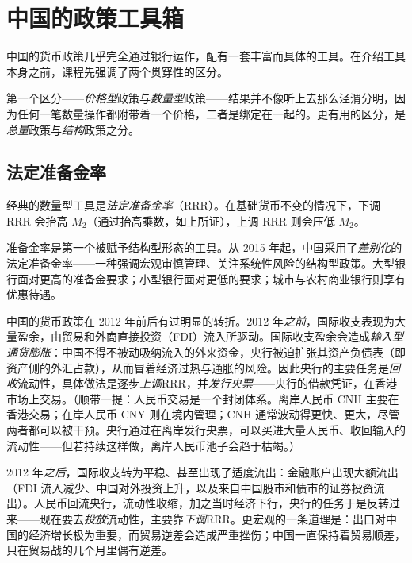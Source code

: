 
\section{中国的政策工具箱}

中国的货币政策几乎完全通过银行运作，配有一套丰富而具体的工具。在介绍工具本身之前，课程先强调了两个贯穿性的区分。

第一个区分——\emph{价格型}政策与\emph{数量型}政策——结果并不像听上去那么泾渭分明，因为任何一笔数量操作都附带着一个价格，二者是绑定在一起的。更有用的区分，是\emph{总量}政策与\emph{结构}政策之分。


\subsection{法定准备金率}

经典的数量型工具是\emph{法定准备金率}（RRR）。在基础货币不变的情况下，下调 RRR 会抬高 $M_2$（通过抬高乘数，如上所证），上调 RRR 则会压低 $M_2$。

\begin{remark}[2015 年以来的差别化准备金率]
准备金率是第一个被赋予结构型形态的工具。从 2015 年起，中国采用了\emph{差别化}的法定准备金率——一种强调宏观审慎管理、关注系统性风险的结构型政策。大型银行面对更高的准备金要求；小型银行面对更低的要求；城市与农村商业银行则享有优惠待遇。
\end{remark}

\begin{remark}
中国的货币政策在 2012 年前后有过明显的转折。2012 年\emph{之前}，国际收支表现为大量盈余，由贸易和外商直接投资（FDI）流入所驱动。国际收支盈余会造成\emph{输入型通货膨胀}：中国不得不被动吸纳流入的外来资金，央行被迫扩张其资产负债表（即资产侧的外汇占款），从而冒着经济过热与通胀的风险。因此央行的主要任务是\emph{回收}流动性，具体做法是逐步\emph{上调}RRR，并\emph{发行央票}——央行的借款凭证，在香港市场上交易。（顺带一提：人民币交易是一个封闭体系。离岸人民币 CNH 主要在香港交易；在岸人民币 CNY 则在境内管理；CNH 通常波动得更快、更大，尽管两者都可以被干预。央行通过在离岸发行央票，可以买进大量人民币、收回输入的流动性——但若持续这样做，离岸人民币池子会趋于枯竭。）

2012 年\emph{之后}，国际收支转为平稳、甚至出现了适度流出：金融账户出现大额流出（FDI 流入减少、中国对外投资上升，以及来自中国股市和债市的证券投资流出）。人民币回流央行，流动性收缩，加之当时经济下行，央行的任务于是反转过来——现在要去\emph{投放}流动性，主要靠\emph{下调}RRR。更宏观的一条道理是：出口对中国的经济增长极为重要，而贸易逆差会造成严重挫伤；中国一直保持着贸易顺差，只在贸易战的几个月里偶有逆差。
\end{remark}

